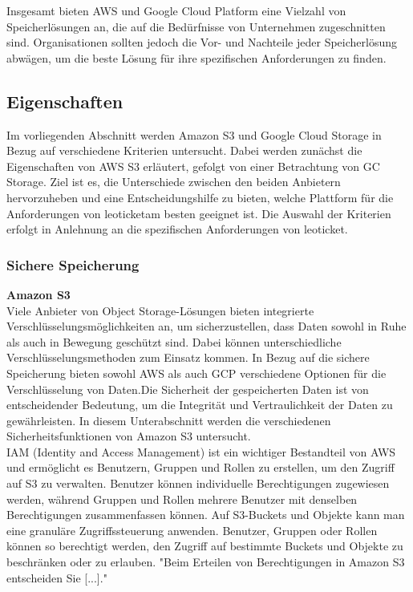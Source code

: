Insgesamt bieten AWS und Google Cloud Platform eine Vielzahl von Speicherlösungen an, die auf die Bedürfnisse von Unternehmen zugeschnitten sind. Organisationen sollten jedoch die Vor- und Nachteile jeder Speicherlösung abwägen, um die beste Lösung für ihre spezifischen Anforderungen zu finden.

\newpage

\subsection{Eigenschaften}

Im vorliegenden Abschnitt werden Amazon S3 und Google Cloud Storage in Bezug auf verschiedene Kriterien untersucht. Dabei werden zunächst die Eigenschaften von AWS S3 erläutert, gefolgt von einer Betrachtung von GC Storage. Ziel ist es, die Unterschiede zwischen den beiden Anbietern hervorzuheben und eine Entscheidungshilfe zu bieten, welche Plattform für die Anforderungen von \glqq leoticket\grqq am besten geeignet ist. Die Auswahl der Kriterien erfolgt in Anlehnung an die spezifischen Anforderungen von \glqq leoticket\grqq.


\newpage

\subsubsection{Sichere Speicherung}

\textbf{Amazon S3}\\

Viele Anbieter von Object Storage-Lösungen bieten integrierte Verschlüsselungsmöglichkeiten an, um sicherzustellen, dass Daten sowohl in Ruhe als auch in Bewegung geschützt sind. Dabei können unterschiedliche Verschlüsselungsmethoden zum Einsatz kommen. In Bezug auf die sichere Speicherung bieten sowohl AWS als auch GCP verschiedene Optionen für die Verschlüsselung von Daten.Die Sicherheit der gespeicherten Daten ist von entscheidender Bedeutung, um die Integrität und Vertraulichkeit der Daten zu gewährleisten. In diesem Unterabschnitt werden die verschiedenen Sicherheitsfunktionen von Amazon S3 untersucht.\\

IAM (Identity and Access Management) ist ein wichtiger Bestandteil von AWS und ermöglicht es Benutzern, Gruppen und Rollen zu erstellen, um den Zugriff auf S3 zu verwalten. Benutzer können individuelle Berechtigungen zugewiesen werden, während Gruppen und Rollen mehrere Benutzer mit denselben Berechtigungen zusammenfassen können. Auf S3-Buckets und Objekte kann man eine granuläre Zugriffssteuerung anwenden. Benutzer, Gruppen oder Rollen können so berechtigt werden, den Zugriff auf bestimmte Buckets und Objekte zu beschränken oder zu erlauben. "Beim Erteilen von Berechtigungen in Amazon S3 entscheiden Sie [...]."\cite{aws-iam-s3}\\

